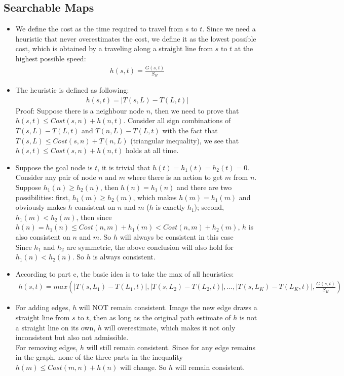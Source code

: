 \documentclass[11pt]{article}
\begin{document}
\begin{onehalfspace}
    \section{Searchable Maps}
    \begin{itemize}
        \item
        We define the cost as the time required to travel from $s$ to $t$. Since we need a heuristic that never overestimates the cost, we define it as the lowest possible cost, which is obtained by a traveling along a straight line from $s$ to $t$ at the highest possible speed: \\
        \begin{eqnarray*}
            h(s, t) = \frac{G(s, t)}{S_H}
        \end{eqnarray*}
        \item
        The heuristic is defined as following:
        \begin{eqnarray*}
            h(s, t) = |T(s, L) - T(L, t)|
        \end{eqnarray*}
        Proof: Suppose there is a neighbour node $n$, then we need to prove that $h(s, t) \leq Cost(s, n) + h(n, t)$. Consider all sign combinations of $T(s, L) - T(L, t)$ and $T(n, L) - T(L, t)$ with the fact that $T(s, L) \leq Cost(s, n) + T(n, L)$ (triangular inequality), we see that $h(s, t) \leq Cost(s, n) + h(n, t)$ holds at all time.
        \item
        Suppose the goal node is $t$, it is trivial that $h(t) = h_1(t) = h_2(t) = 0$.
        Consider any pair of node $n$ and $m$ where there is an action to get $m$ from $n$. Suppose $h_1(n) \geq h_2(n)$, then $h(n) = h_1(n)$ and there are two possibilities: first, $h_1(m) \geq h_2(m)$, which makes $h(m) = h_1(m)$ and obviously makes $h$ consistent on $n$ and $m$ ($h$ is exactly $h_1$); second, $h_1(m) < h_2(m)$, then since $h(n) = h_1(n) \leq Cost(n,m) + h_1(m) < Cost(n,m) + h_2(m)$, $h$ is also consistent on $n$ and $m$. So $h$ will always be consistent in this case\\
        Since $h_1$ and $h_2$ are symmetric, the above conclusion will also hold for $h_1(n) < h_2(n)$. So $h$ is always consistent.
        \item According to part c, the basic idea is to take the max of all heuristics:
        \begin{eqnarray*}
            h(s, t) = max(|T(s, L_1) - T(L_1, t)|, |T(s, L_2) - T(L_2, t)|, ... , |T(s, L_K) - T(L_K, t)|, \frac{G(s, t)}{S_H})
        \end{eqnarray*}
        \item
        For adding edges, $h$ will NOT remain consistent. Image the new edge draws a straight line from $s$ to $t$, then as long as the original path estimate of $h$ is not a straight line on its own, $h$ will overestimate, which makes it not only inconsistent but also not admissible. \\
        For removing edges, $h$ will still remain consistent. Since for any edge remains in the graph, none of the three parts in the inequality $h(m) \leq Cost(m, n) + h(n)$ will change. So $h$ will remain consistent.
    \end{itemize}
    \newpage{}

\end{onehalfspace}
\end{document}

